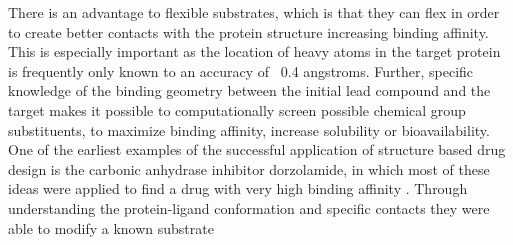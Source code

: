 There is an advantage to flexible substrates, which is that they can flex in order to create better contacts with the protein structure increasing binding affinity.
This is especially important as the location of heavy atoms in the target protein is frequently only known to an accuracy of ~0.4 angstroms.
Further, specific knowledge of the binding geometry between the initial lead compound and the target makes it possible to computationally screen possible chemical group substituents, to maximize binding affinity, increase solubility or bioavailability.
One of the earliest examples of the successful application of structure based drug design is the carbonic anhydrase inhibitor dorzolamide, in which most of these ideas were applied to find a drug with very high binding affinity \cite{greer1994application}.
Through understanding the protein-ligand conformation and specific contacts they were able to modify a known substrate


